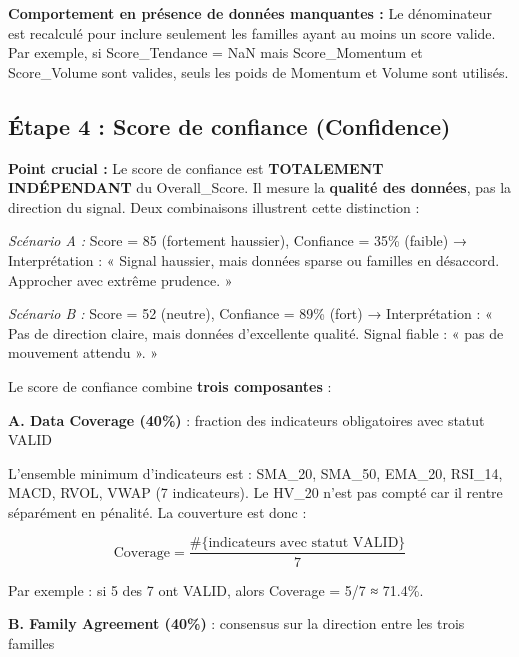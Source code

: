 \documentclass{rapportENSIAS} %
\begin{document}
\noindent
\textbf{Comportement en présence de données manquantes :} Le dénominateur est recalculé pour inclure seulement les familles ayant au moins un score valide. Par exemple, si Score\_Tendance = NaN mais Score\_Momentum et Score\_Volume sont valides, seuls les poids de Momentum et Volume sont utilisés.

\subsection{Étape 4 : Score de confiance (Confidence)}

\noindent
\textbf{Point crucial :} Le score de confiance est \textbf{TOTALEMENT INDÉPENDANT} du Overall\_Score. Il mesure la \textbf{qualité des données}, pas la direction du signal. Deux combinaisons illustrent cette distinction :

\vspace{0.3cm}
\noindent
\textit{Scénario A :} Score = 85 (fortement haussier), Confiance = 35\% (faible)
\newline
→ Interprétation : « Signal haussier, mais données sparse ou familles en désaccord. Approcher avec extrême prudence. »

\vspace{0.2cm}
\noindent
\textit{Scénario B :} Score = 52 (neutre), Confiance = 89\% (fort)
\newline
→ Interprétation : « Pas de direction claire, mais données d'excellente qualité. Signal fiable : « pas de mouvement attendu ». »

\vspace{0.3cm}
\noindent
Le score de confiance combine \textbf{trois composantes} :

\vspace{0.2cm}
\noindent
\textbf{A. Data Coverage (40\%)} : fraction des indicateurs obligatoires avec statut VALID

\noindent
L'ensemble minimum d'indicateurs est : SMA\_20, SMA\_50, EMA\_20, RSI\_14, MACD, RVOL, VWAP (7 indicateurs). Le HV\_20 n'est pas compté car il rentre séparément en pénalité. La couverture est donc :

\[
\text{Coverage} = \frac{\#\{\text{indicateurs avec statut VALID}\}}{7}
\]

\noindent
Par exemple : si 5 des 7 ont VALID, alors Coverage = 5/7 ≈ 71.4\%.

\vspace{0.3cm}
\noindent
\textbf{B. Family Agreement (40\%)} : consensus sur la direction entre les trois familles
\end{document}
